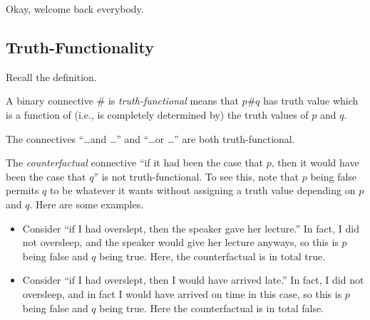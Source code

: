\documentclass[../notes.tex]{subfiles}
\begin{document}

Okay, welcome back everybody.

\subsection{Truth-Functionality}
Recall the definition.
\begin{definition}
	A binary connective $\#$ is \textit{truth-functional} means that $p\#q$ has truth value which is a function of (i.e., is completely determined by) the truth values of $p$ and $q$.
\end{definition}
\begin{example}
	The connectives ``\ldots and \ldots'' and ``\ldots or \ldots'' are both truth-functional.
\end{example}
\begin{nex}
	The \textit{counterfactual} connective ``if it had been the case that $p$, then it would have been the case that $q$'' is not truth-functional. To see this, note that $p$ being false permits $q$ to be whatever it wants without assigning a truth value depending on $p$ and $q$. Here are some examples.
	\begin{itemize}
		\item Consider ``if I had overslept, then the speaker gave her lecture.'' In fact, I did not oversleep, and the speaker would give her lecture anyways, so this is $p$ being false and $q$ being true. Here, the counterfactual is in total true.
		\item Consider ``if I had overslept, then I would have arrived late.'' In fact, I did not oversleep, and in fact I would have arrived on time in this case, so this is $p$ being false and $q$ being true. Here the counterfactual is in total false.
	\end{itemize}
\end{nex}
\end{document}

